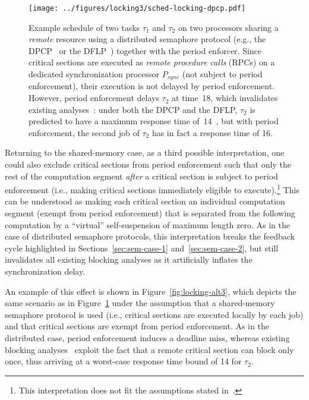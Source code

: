 \begin{figure}[t]
  \centering
  \texttt{[image: ../figures/locking3/sched-locking-dpcp.pdf]}
  \caption{Example schedule of two tasks $\tau_1$ and $\tau_2$ on two processors sharing a \emph{remote} resource using a distributed semaphore protocol (e.g., the DPCP~\cite{RSL:88,Raj:91} or the DFLP~\cite{Br:13,Br:14}) together with the period enforcer. Since critical sections are executed as \emph{remote procedure calls} (RPCs) on a dedicated synchronization processor $P_{sync}$ (not subject to period enforcement), their execution is not delayed by period enforcement. However, period enforcement delays $\tau_2$ at time~18, which invalidates existing analyses~\cite{RSL:88,Raj:91,Br:13}: under both the DPCP and the DFLP, $\tau_2$ is predicted to have a maximum response time of~14~\cite{Br:13}, but with period enforcement, the second job of $\tau_2$ has in fact a response time of 16.
  }
  \label{fig:locking-dpcp}
\end{figure}

Returning to the shared-memory case,
as a third possible interpretation, one could also exclude critical sections from period enforcement such that only the rest of the computation segment \emph{after} a critical section is subject to period enforcement (i.e., making critical sections immediately eligible to execute).\footnote{This interpretation does not fit the assumptions stated in~\cite{Raj:suspension1991,Raj:91}.} This can be understood as making each critical section an individual computation segment (exempt from period enforcement) that is separated from the following computation by a ``virtual'' self-suspension of maximum length zero. As in the case of distributed semaphore protocols, this interpretation breaks the feedback cycle highlighted in Sections~\ref{sec:sem-case-1} and~\ref{sec:sem-case-2}, but still invalidates all existing blocking analyses as it artificially inflates the synchronization delay.

An example of this effect is shown in  Figure~\ref{fig:locking-alt3}, which depicts the same scenario as in Figure~\ref{fig:locking-dpcp} under the assumption that a shared-memory semaphore protocol is used (i.e., critical sections are executed locally by each job) and that critical sections are exempt from period enforcement. As in the distributed case, period enforcement induces a deadline miss, whereas existing blocking analyses~\cite{Br:13,LNR:09} exploit the fact that a remote critical section can block only once, thus arriving at a worst-case response time bound of 14 for $\tau_2$.

